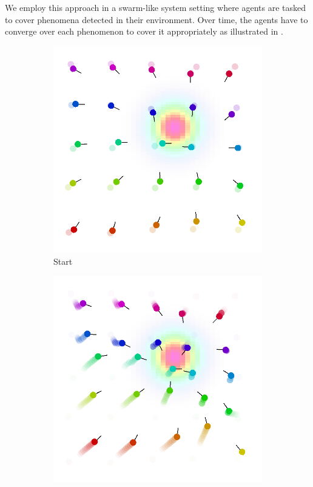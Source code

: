 We employ this approach in a swarm-like system setting where agents are tasked to cover phenomena detected in their environment. 
Over time, the agents have to converge over each phenomenon to cover it appropriately as illustrated in .
\begin{figure}[t]
	\centering
	\begin{subfigure}[b]{0.32\linewidth}
		\includegraphics[width=\textwidth]{papers/acsos2023/imgs/start.png}
		\caption{Start}
		\label{acsos2023:fig:initial}
	\end{subfigure}
	\begin{subfigure}[b]{0.32\linewidth}
		\includegraphics[width=\textwidth]{papers/acsos2023/imgs/after.png}

\end{subfigure}
\end{figure}
